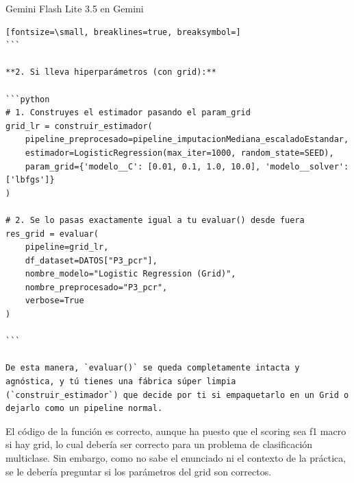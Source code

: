 \documentclass[12pt,a4paper,oneside]{book}
\begin{document}
\begin{iaresp}{Gemini Flash Lite 3.5 en Gemini}
\begin{Verbatim}[fontsize=\small, breaklines=true, breaksymbol=]
```

**2. Si lleva hiperparámetros (con grid):**

```python
# 1. Construyes el estimador pasando el param_grid
grid_lr = construir_estimador(
    pipeline_preprocesado=pipeline_imputacionMediana_escaladoEstandar,
    estimador=LogisticRegression(max_iter=1000, random_state=SEED),
    param_grid={'modelo__C': [0.01, 0.1, 1.0, 10.0], 'modelo__solver': ['lbfgs']}
)

# 2. Se lo pasas exactamente igual a tu evaluar() desde fuera
res_grid = evaluar(
    pipeline=grid_lr, 
    df_dataset=DATOS["P3_pcr"], 
    nombre_modelo="Logistic Regression (Grid)", 
    nombre_preprocesado="P3_pcr", 
    verbose=True
)

```

De esta manera, `evaluar()` se queda completamente intacta y agnóstica, y tú tienes una fábrica súper limpia (`construir_estimador`) que decide por ti si empaquetarlo en un Grid o dejarlo como un pipeline normal.
\end{Verbatim}
\end{iaresp}
\begin{iaanalisis}
El código de la función es correcto, aunque ha puesto que el scoring sea f1 macro si hay grid, lo cual debería ser correcto para un problema de clasificación multiclase. Sin embargo, como no sabe el enunciado ni el contexto de la práctica, se le debería preguntar si los parámetros del grid son correctos.
\end{iaanalisis}
\end{document}
